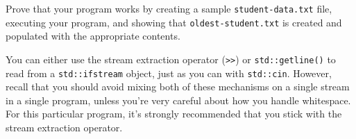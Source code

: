 \documentclass{article}
\newenvironment{hint}
    {\begin{tcolorbox}[title=Hint,colframe=white!70!blue,colback=white]}
    {\end{tcolorbox}}
\begin{document}
Prove that your program works by creating a sample \texttt{student-data.txt} file, executing your program, and showing that \texttt{oldest-student.txt} is created and populated with the appropriate contents.

\begin{hint}
    You can either use the stream extraction operator (\texttt{>>}) or \texttt{std::getline()} to read from a \texttt{std::ifstream} object, just as you can with \texttt{std::cin}. However, recall that you should avoid mixing both of these mechanisms on a single stream in a single program, unless you're very careful about how you handle whitespace. For this particular program, it's strongly recommended that you stick with the stream extraction operator.
\end{hint}
\end{document}
